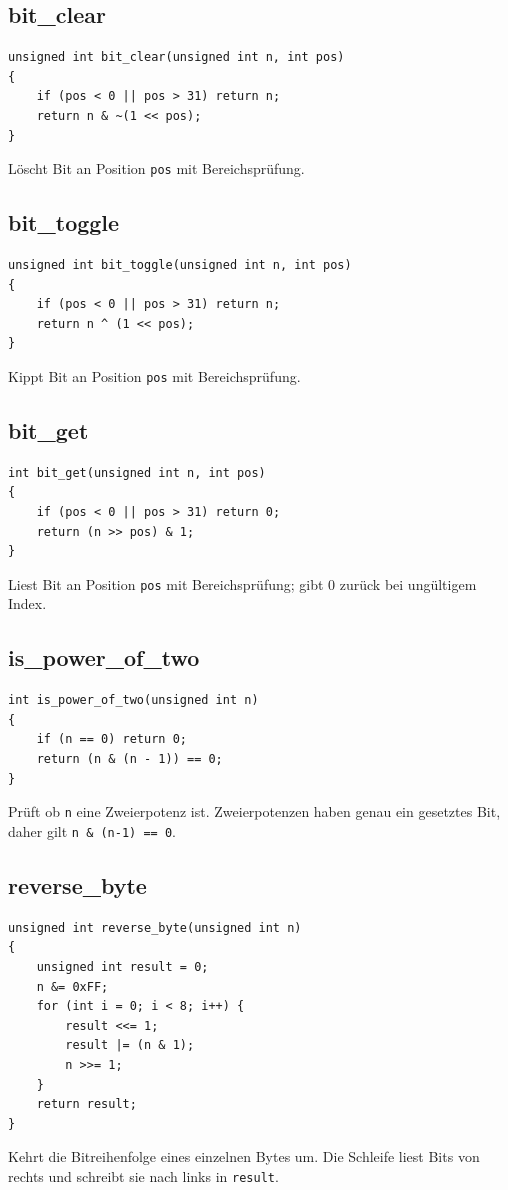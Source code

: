 \documentclass[10pt, a4paper]{article}
\begin{document}
\subsection{bit\_clear}
\begin{lstlisting}
unsigned int bit_clear(unsigned int n, int pos)
{
    if (pos < 0 || pos > 31) return n;
    return n & ~(1 << pos);
}
\end{lstlisting}
L\"oscht Bit an Position \texttt{pos} mit Bereichspr\"ufung.

\subsection{bit\_toggle}
\begin{lstlisting}
unsigned int bit_toggle(unsigned int n, int pos)
{
    if (pos < 0 || pos > 31) return n;
    return n ^ (1 << pos);
}
\end{lstlisting}
Kippt Bit an Position \texttt{pos} mit Bereichspr\"ufung.

\subsection{bit\_get}
\begin{lstlisting}
int bit_get(unsigned int n, int pos)
{
    if (pos < 0 || pos > 31) return 0;
    return (n >> pos) & 1;
}
\end{lstlisting}
Liest Bit an Position \texttt{pos} mit Bereichspr\"ufung; gibt 0 zur\"uck bei ung\"ultigem Index.

\subsection{is\_power\_of\_two}
\begin{lstlisting}
int is_power_of_two(unsigned int n)
{
    if (n == 0) return 0;
    return (n & (n - 1)) == 0;
}
\end{lstlisting}
Pr\"uft ob \texttt{n} eine Zweierpotenz ist. Zweierpotenzen haben genau ein gesetztes Bit, daher gilt \texttt{n \& (n-1) == 0}.

\subsection{reverse\_byte}
\begin{lstlisting}
unsigned int reverse_byte(unsigned int n)
{
    unsigned int result = 0;
    n &= 0xFF;
    for (int i = 0; i < 8; i++) {
        result <<= 1;
        result |= (n & 1);
        n >>= 1;
    }
    return result;
}
\end{lstlisting}
Kehrt die Bitreihenfolge eines einzelnen Bytes um. Die Schleife liest Bits von rechts und schreibt sie nach links in \texttt{result}.
\end{document}
